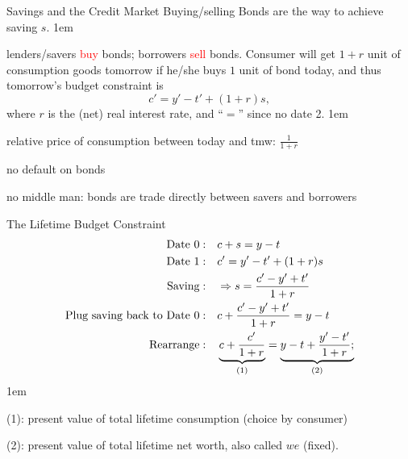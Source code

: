 \documentclass[11pt,aspectratio=43]{beamer}
\newcommand{\red}[1]{\textcolor{red}{#1}}
\let\olditemize=\itemize
\let\endolditemize=\enditemize
\renewenvironment{itemize}{\olditemize \itemsep1em}{\endolditemize}
\theoremstyle{definition}
\begin{document}
\begin{frame}{Savings and the Credit Market}
\label{slide:Savings_and_the_Credit_Market}
    Buying/selling \alert{Bonds} are the way to achieve saving $ s $.
    \begin{itemize}
        \item lenders/savers \red{buy} bonds; borrowers \red{sell} bonds.
    \end{itemize}
    Consumer will get $ 1+r $ unit of consumption goods tomorrow if he/she buys $ 1 $ unit of bond today, and thus tomorrow's budget constraint is
    \begin{equation*}
       c'= y' - t'+ ( 1+r )s
    ,\end{equation*}
    where $ r $ is the (net) \alert{real interest rate}, and ``$=$'' since \alert{no date 2}.
    \begin{itemize}
        \item \alert{relative price} of consumption between today and tmw: $ \frac{1}{1+r} $
        \item no default on bonds
        \item no middle man: bonds are trade directly between savers and borrowers
    \end{itemize}
\end{frame}

\begin{frame}{The Lifetime Budget Constraint}
\label{slide:The_Lifetime_Budget_Constraint}
    \begin{align*}
        \text{Date 0}: \quad
            & c + s = y - t
        \\
        \text{Date 1}: \quad
            & c' = y' - t' + ( 1+r )s
        \\
        \text{Saving}: \quad
            & \Rightarrow s = \frac{c' - y' + t'}{1+r}
        \\
        \text{Plug saving back to Date 0}: \quad
            & c + \frac{c' - y' + t'}{1+r} = y - t
        \\
        \text{Rearrange}: \quad
            & \underbrace{%
                c + \frac{c'}{1+r}
              }_{\text{(1)}}
                =
              \underbrace{%
                y - t + \frac{y' - t'}{1+r};
              }_{\text{(2)}}
    \end{align*}
    \begin{itemize}
        \item (1): \alert{present value of total lifetime consumption} (choice by consumer)
        \item (2): \alert{present value of total lifetime net worth}, also called $ we $ (fixed).
    \end{itemize}
\end{frame}
\end{document}
